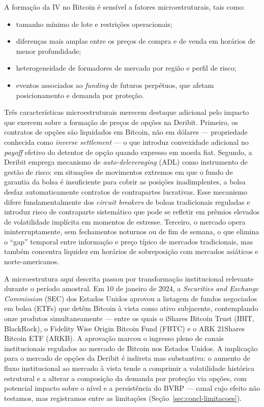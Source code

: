 A formação da IV no Bitcoin é sensível a fatores microestruturais, tais como:

\begin{itemize}
    \item tamanho mínimo de lote e restrições operacionais;
    \item diferenças mais amplas entre os preços de compra e de venda em
          horários de menor profundidade;
    \item heterogeneidade de formadores de mercado por região e perfil de risco;
    \item eventos associados ao \textit{funding} de futuros perpétuos, que afetam
          posicionamento e demanda por proteção.
\end{itemize}

Três características microestruturais merecem destaque adicional pelo impacto que exercem sobre a formação de preços de opções na Deribit. Primeiro, os contratos de opções são liquidados em Bitcoin, não em dólares --- propriedade conhecida como \textit{inverse settlement} --- o que introduz convexidade adicional no \textit{payoff} efetivo do detentor de opção quando expresso em moeda fiat. Segundo, a Deribit emprega mecanismo de \textit{auto-deleveraging} (ADL) como instrumento de gestão de risco: em situações de movimentos extremos em que o fundo de garantia da bolsa é insuficiente para cobrir as posições inadimplentes, a bolsa desfaz automaticamente contratos de contrapartes lucrativas. Esse mecanismo difere fundamentalmente dos \textit{circuit breakers} de bolsas tradicionais reguladas e introduz risco de contraparte sistemático que pode se refletir em prêmios elevados de volatilidade implícita em momentos de estresse. Terceiro, o mercado opera ininterruptamente, sem fechamentos noturnos ou de fim de semana, o que elimina o ``gap'' temporal entre informação e preço típico de mercados tradicionais, mas também concentra liquidez em horários de sobreposição com mercados asiáticos e norte-americanos.

A microestrutura aqui descrita passou por transformação institucional relevante durante o período amostral. Em 10 de janeiro de 2024, a \textit{Securities and Exchange Commission} (SEC) dos Estados Unidos aprovou a listagem de fundos negociados em bolsa (ETFs) que detêm Bitcoin à vista como ativo subjacente, contemplando onze produtos simultaneamente --- entre os quais o iShares Bitcoin Trust (IBIT, BlackRock), o Fidelity Wise Origin Bitcoin Fund (FBTC) e o ARK 21Shares Bitcoin ETF (ARKB). A aprovação marcou o ingresso pleno de canais institucionais regulados ao mercado de Bitcoin nos Estados Unidos. A implicação para o mercado de opções da Deribit é indireta mas substantiva: o aumento de fluxo institucional ao mercado à vista tende a comprimir a volatilidade histórica estrutural e a alterar a composição da demanda por proteção via opções, com potencial impacto sobre o nível e a persistência do BVRP --- canal cujo efeito não testamos, mas registramos entre as limitações (Seção~\ref{sec:concl-limitacoes}).

